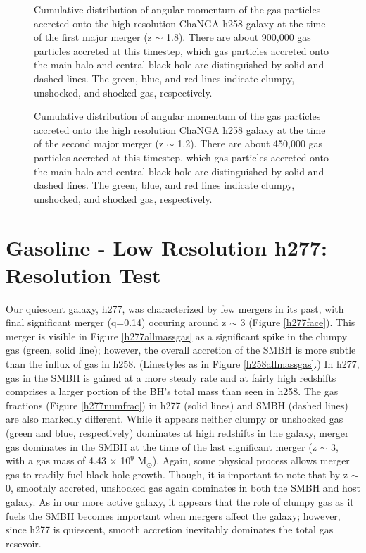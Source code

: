 \documentclass[12pt,headA,chapB]{fiskthesis}
\begin{document}
\begin{figure}
\centerline{}
\caption[ChaNGa h258 First Merger Angular Momentum Distribution]{ Cumulative distribution of angular momentum of the gas particles accreted onto the high resolution ChaNGA h258 galaxy at the time of the first major merger (z $\sim$ 1.8). There are about 900,000 gas particles accreted at this timestep, which gas particles accreted onto the main halo and central black hole are distinguished by solid and dashed lines. The green, blue, and red lines indicate clumpy, unshocked, and shocked gas, respectively.}
\label{hrh258angmom_merger1} 

\centerline{}
\caption[ChaNGa h258 Second Merger Angular Momentum Distribution]{ Cumulative distribution of angular momentum of the gas particles accreted onto the high resolution ChaNGA h258 galaxy at the time of the second major merger (z $\sim$ 1.2). There are about 450,000 gas particles accreted at this timestep, which gas particles accreted onto the main halo and central black hole are distinguished by solid and dashed lines. The green, blue, and red lines indicate clumpy, unshocked, and shocked gas, respectively.}
\label{hrh258angmom_merger2} 
\end{figure}


\section{Gasoline - Low Resolution h277: Resolution Test}
	
Our quiescent galaxy, h277, was characterized by few mergers in its past, with final significant merger (q=0.14) occuring around z $\sim$ 3 (Figure \ref{h277face}). This merger is visible in Figure \ref{h277allmassgas} as a significant spike in the clumpy gas (green, solid line); however, the overall accretion of the SMBH is more subtle than the influx of gas in h258. (Linestyles as in Figure \ref{h258allmassgas}.) In h277, gas in the SMBH is gained at a more steady rate and at fairly high redshifts comprises a larger portion of the BH's total mass than seen in h258. The gas fractions (Figure \ref{h277numfrac}) in h277 (solid lines) and SMBH (dashed lines) are also markedly different. While it appears neither clumpy or unshocked gas (green and blue, respectively) dominates at high redshifts in the galaxy, merger gas dominates in the SMBH at the time of the last significant merger (z $\sim$ 3, with a gas mass of 4.43 $\times$ 10$^9$ M$_{\odot}$). Again, some physical process allows merger gas to readily fuel black hole growth. Though, it is important to note that by z $\sim$ 0, smoothly accreted, unshocked gas again dominates in both the SMBH and host galaxy. As in our more active galaxy, it appears that the role of clumpy gas as it fuels the SMBH becomes important when mergers affect the galaxy; however, since h277 is quiescent, smooth accretion inevitably dominates the total gas resevoir.
\end{document}
